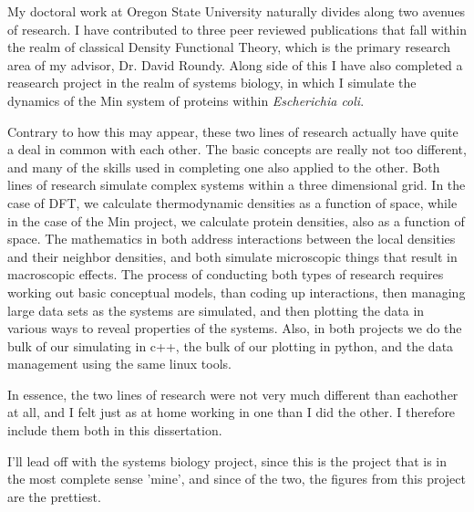My doctoral work at Oregon State University naturally divides along
two avenues of research.  I have contributed to three peer reviewed
publications that fall within the realm of classical Density
Functional Theory, which is the primary research area of my advisor,
Dr. David Roundy.  Along side of this I have also completed a
reasearch project in the realm of systems biology, in which I simulate
the dynamics of the Min system of proteins within \emph{Escherichia
  coli}.

Contrary to how this may appear, these two lines of research actually
have quite a deal in common with each other.  The basic concepts are
really not too different, and many of the skills used in completing
one also applied to the other.  Both lines of research simulate
complex systems within a three dimensional grid.  In the case of DFT,
we calculate thermodynamic densities as a function of space, while in
the case of the Min project, we calculate protein densities, also as a
function of space.  The mathematics in both address interactions
between the local densities and their neighbor densities, and both
simulate microscopic things that result in macroscopic effects.  The
process of conducting both types of research requires working out
basic conceptual models, than coding up interactions, then managing
large data sets as the systems are simulated, and then plotting the
data in various ways to reveal properties of the systems.  Also, in
both projects we do the bulk of our simulating in c++, the bulk of our
plotting in python, and the data management using the same linux
tools.

In essence, the two lines of research were not very much different
than eachother at all, and I felt just as at home working in one than
I did the other.  I therefore include them both in this dissertation.

I'll lead off with the systems biology project, since this is the
project that is in the most complete sense 'mine', and since of the
two, the figures from this project are the prettiest.%


